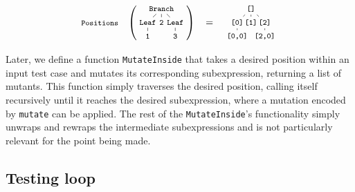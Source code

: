 \documentclass[sigconf,review,anonymous]{acmart}
\begin{document}
\vspace{-5pt}
\begin{equation}
  \nonumber
  \footnotesize
  \texttt{Positions}\quad
  \left(
  \tikz[
    baseline=-6mm,
    level distance=0.5cm,
    level 1/.style={sibling distance=0.5cm},
    level 2/.style={sibling distance=0.5cm}
  ]{
    \node {\texttt{Branch}}
      child {node {\texttt{Leaf}}
        child {node {\texttt{1}}}
      }
      child {node {\texttt{2}}}
      child {node {\texttt{Leaf}}
        child {node {\texttt{3}}}
      };
  }
  \right)
  \quad
  =
  \quad
  \tikz[
    baseline=-6mm,
    level distance=0.5cm,
    level 1/.style={sibling distance=0.5cm},
    level 2/.style={sibling distance=0.5cm}
  ]{
    \node {\texttt{[]}}
      child {node {\texttt{[0]}}
        child {node {\texttt{[0,0]}}}
      }
      child {node {\texttt{[1]}}}
      child {node {\texttt{[2]}}
        child {node {\texttt{[2,0]}}}
      };
  }
\end{equation}

Later, we define a function \texttt{MutateInside} that takes a desired position
within an input test case and mutates its corresponding subexpression, returning
a list of mutants.
%
%
%
%
This function simply traverses the desired position, calling itself recursively
until it reaches the desired subexpression, where a mutation encoded by \texttt{mutate} can be
applied.
%
The rest of the \texttt{MutateInside}'s functionality simply unwraps and rewraps the
intermediate subexpressions and is not particularly relevant for the point being
made.


\subsection{Testing loop}
\end{document}
